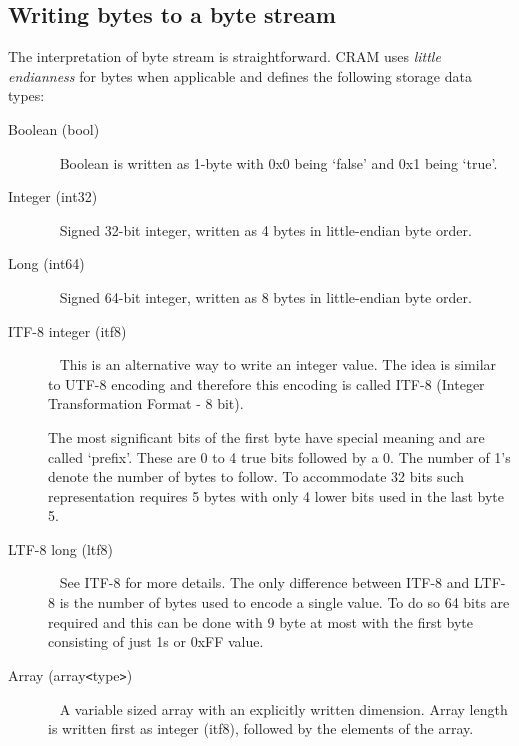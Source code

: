 \documentclass[a4paper]{article}
\begin{document}
\subsection{\textbf{Writing bytes to a byte stream}}
\label{subsec:writing-bytes}

The interpretation of byte stream is straightforward. CRAM uses \emph{little endianness}
for bytes when applicable and defines the following storage data types:

\begin{description}

\item[Boolean (bool)]\ \newline
Boolean is written as 1-byte with 0x0 being `false' and 0x1 being `true'.

\item[Integer (int32)]\ \newline
Signed 32-bit integer, written as 4 bytes in little-endian byte order.

\item[Long (int64)]\ \newline
Signed 64-bit integer, written as 8 bytes in little-endian byte order.

\item[ITF-8 integer (itf8)]\ \newline
This is an alternative way to write an integer value. The idea is similar to UTF-8 
encoding and therefore this encoding is called ITF-8 (Integer Transformation Format 
- 8 bit). 

The most significant bits of the first byte have special meaning and are called 
`prefix'. These are 0 to 4 true bits followed by a 0. The number of 1's denote 
the number of bytes to follow. To accommodate 32 bits such representation requires 
5 bytes with only 4 lower bits used in the last byte 5.

\item[LTF-8 long (ltf8)]\ \newline
See ITF-8 for more details. The only difference between ITF-8 and LTF-8 is the 
number of bytes used to encode a single value. To do so 64 bits are required and 
this can be done with 9 byte at most with the first byte consisting of just 1s 
or 0xFF value. 

\item[{Array (array\texttt{<}type\texttt{>})}]\ \newline
A variable sized array with an explicitly written dimension.
Array length is written first as integer (itf8), followed by the elements of the array.


\end{description}
\end{document}
